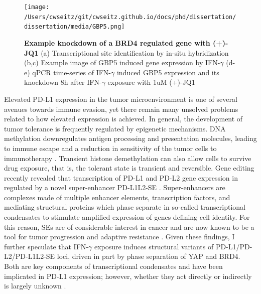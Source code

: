 \begin{figure}[t]
\texttt{[image: /Users/cwseitz/git/cwseitz.github.io/docs/phd/dissertation/dissertation/media/GBP5.png]}
\caption{\textbf{Example knockdown of a BRD4 regulated gene with (+)-JQ1} (a) Transcriptional site identification by in-situ hybridization (b,c) Example image of GBP5 induced gene expression by IFN-$\gamma$ (d-e) qPCR time-series of IFN-$\gamma$ induced GBP5 expression and its knockdown 8h after IFN-$\gamma$ exposure with 1uM (+)-JQ1}
\label{fig:fig31}
\end{figure}

Elevated PD-L1 expression in the tumor microenvironment is one of several avenues towards immune evasion, yet there remain many unsolved problems related to how elevated expression is achieved.  In general, the development of tumor tolerance is frequently regulated by epigenetic mechanisms. DNA methylation downregulates antigen processing and presentation molecules, leading to immune escape and a reduction in sensitivity of the tumor cells to immunotherapy \parencite{Li2021}. Transient histone demethylation can also allow cells to survive drug exposure, that is, the tolerant state is transient and reversible. Gene editing recently revealed that transcription of PD-L1 and PD-L2 gene expression in regulated by a novel super-enhancer PD-L1L2-SE \parencite{Xu2019}. Super-enhancers are complexes made of multiple enhancer elements, transcription factors, and mediating structural proteins which phase separate in so-called transcriptional condensates to stimulate amplified expression of genes defining cell identity. For this reason, SEs are of considerable interest in cancer and are now known to be a tool for tumor progression and adaptive resistance \parencite{Xu2019}. Given these findings, I further speculate that IFN-$\gamma$ exposure induces structural variants of PD-L1/PD-L2/PD-L1L2-SE loci, driven in part by phase separation of YAP and BRD4. Both are key components of transcriptional condensates and have been implicated in PD-L1 expression; however, whether they act directly or indirectly is largely unknown \parencite{Xu2019,Yu2021}.

